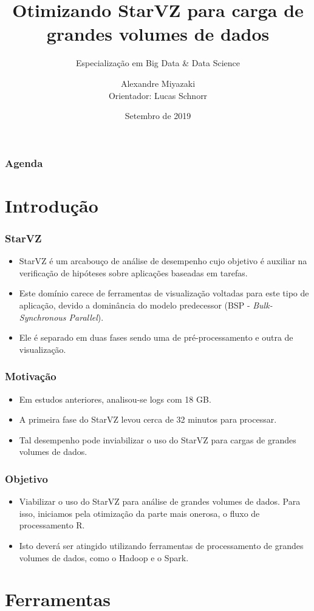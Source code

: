 \documentclass{beamer}
\title[]
      {Otimizando StarVZ para carga de grandes volumes de dados}
\subtitle{Especialização em Big Data \& Data Science}
\date{Setembro de 2019}
\author{Alexandre Miyazaki  \\ Orientador: Lucas Schnorr}
\institute{Instituto de Informática --- UFRGS\\\texttt{inf.ufrgs.br/\~{}bmenegola}}
\begin{document}
\InfTitlePage

\begin{frame}
  \frametitle{Agenda}
  \tableofcontents
\end{frame}

\section{Introdução}
\begin{frame}
\frametitle{StarVZ}
  \begin{itemize}
   \item StarVZ é um arcabouço de análise de desempenho cujo objetivo é auxiliar 
na verificação de hipóteses sobre aplicações baseadas em tarefas.
   \item Este domínio carece de ferramentas de visualização voltadas para este 
tipo de aplicação, devido a dominância do modelo predecessor (BSP - 
\textit{Bulk-Synchronous Parallel}).
  \item Ele é separado em duas fases sendo uma de pré-processamento e outra de 
visualização.
  \end{itemize}
\end{frame}

\begin{frame}
\frametitle{Motivação}
  \begin{itemize}
   \item Em estudos anteriores, analisou-se logs com 18 GB.
   \item A primeira fase do StarVZ levou cerca de 32 minutos para processar.
   \item Tal desempenho pode inviabilizar o uso do StarVZ para cargas de 
grandes volumes de dados.
  \end{itemize}
\end{frame}

\begin{frame}
 \frametitle{Objetivo}
\begin{itemize}
 \item Viabilizar o uso do StarVZ para análise de grandes volumes de dados. 
Para isso, iniciamos pela otimização da parte mais onerosa, o fluxo 
de processamento R.
 \item Isto deverá ser atingido utilizando ferramentas de processamento de 
grandes volumes de dados, como o Hadoop e o Spark.
\end{itemize}
\end{frame}


\section{Ferramentas}
\end{document}
